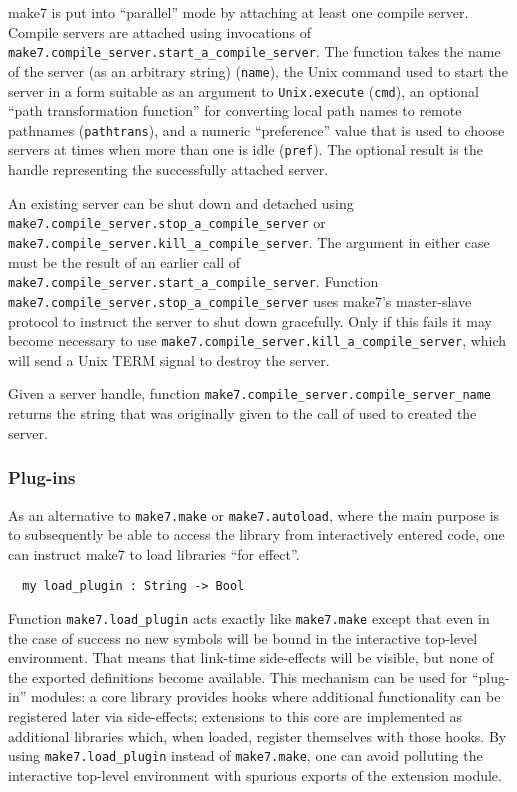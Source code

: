 make7 is put into ``parallel'' mode by attaching at least one compile
server.  Compile servers are attached using invocations of {\tt
make7.compile_server.start_a_compile_server}.  The function takes the
name of the server (as an arbitrary string) ({\tt name}),
the Unix command used to start the server in a form suitable
as an argument to {\tt Unix.execute} ({\tt cmd}), an optional
``path transformation function'' for converting local path names
to remote pathnames ({\tt pathtrans}), and a numeric ``preference''
value that is used to choose servers at times when more than one
is idle ({\tt pref}).  The optional result is the handle representing
the successfully attached server.

An existing server can be shut down and detached using {\tt
make7.compile_server.stop_a_compile_server} or {\tt make7.compile_server.kill_a_compile_server}.
The argument in either case must be the result of an earlier call
of {\tt make7.compile_server.start_a_compile_server}.
Function {\tt make7.compile_server.stop_a_compile_server} uses make7's
master-slave protocol to instruct the server to shut down gracefully.
Only if this fails it may become necessary to use {\tt make7.compile_server.kill_a_compile_server},
which will send a Unix TERM signal to destroy the server.

Given a server handle, function {\tt make7.compile_server.compile_server_name}
returns the string that was originally given to the call of used to created the server.

\subsubsection{Plug-ins}

As an alternative to {\tt make7.make} or {\tt make7.autoload}, where the
main purpose is to subsequently be able to access the library from
interactively entered code, one can instruct make7 to load libraries
``for effect''.

\begin{verbatim}
  my load_plugin : String -> Bool
\end{verbatim}

Function {\tt make7.load\_plugin} acts exactly like {\tt make7.make} except
that even in the case of success no new symbols will be bound in the
interactive top-level environment.  That means that link-time
side-effects will be visible, but none of the exported definitions
become available.  This mechanism can be used for ``plug-in'' modules:
a core library provides hooks where additional functionality can be
registered later via side-effects; extensions to this core are
implemented as additional libraries which, when loaded, register
themselves with those hooks.  By using {\tt make7.load\_plugin} instead
of {\tt make7.make}, one can avoid polluting the interactive top-level
environment with spurious exports of the extension module.

